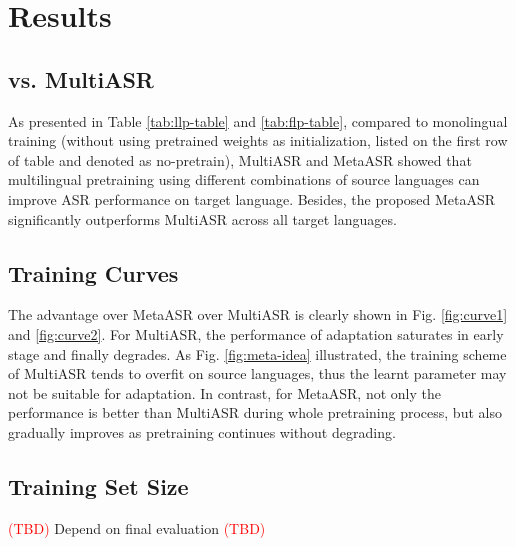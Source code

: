 \section{Results}
\label{sec:results}

\subsection{vs. MultiASR}
\label{ssec:baseline-multitask}

As presented in Table \ref{tab:llp-table} and \ref {tab:flp-table}, compared to monolingual training (without using pretrained weights as initialization,  listed on the first row of table and denoted as no-pretrain), MultiASR and MetaASR showed that multilingual pretraining using different combinations of source languages can improve ASR performance on target language. Besides, the proposed MetaASR significantly outperforms MultiASR across all target languages.





\subsection{Training Curves}

The advantage over MetaASR over MultiASR is clearly shown in Fig. \ref{fig:curve1} and \ref{fig:curve2}. For MultiASR, the performance of adaptation saturates in early stage and finally degrades. As Fig. \ref{fig:meta-idea} illustrated, the training scheme of MultiASR tends to overfit on source languages, thus the learnt parameter may not be suitable for adaptation. In contrast, for MetaASR, not only the performance is better than MultiASR during whole pretraining process, but also gradually improves as pretraining continues without degrading.


\subsection{Training Set Size}
\textcolor{red}{(TBD)} Depend on final evaluation \textcolor{red}{(TBD)}
%
